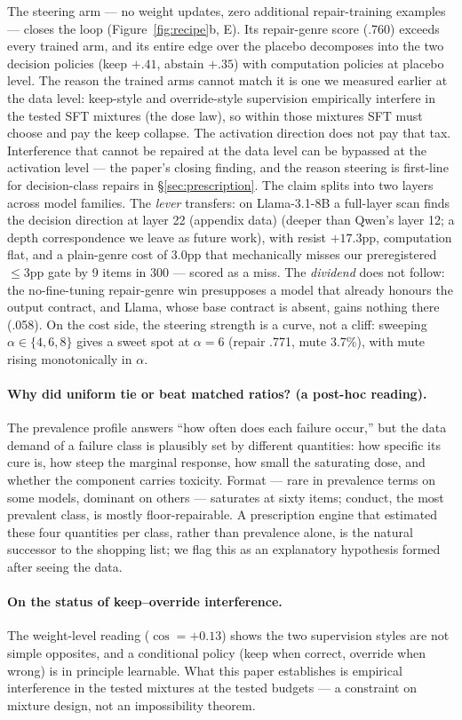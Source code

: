 The steering arm --- no weight updates, zero additional repair-training examples --- closes the loop
(Figure~\ref{fig:recipe}b, E). Its repair-genre score (.760) exceeds every
trained arm, and its entire edge over the placebo decomposes into the two
decision policies (keep $+.41$, abstain $+.35$) with computation policies at
placebo level. The reason the trained arms cannot match it is one we measured
earlier at the data level: keep-style and override-style supervision empirically interfere in the tested SFT mixtures (the dose law), so within those mixtures SFT must choose and pay the keep collapse. The activation direction does not pay that
tax. Interference that cannot be repaired at the data level can be bypassed at
the activation level --- the paper's closing finding, and the reason steering
is first-line for decision-class repairs in \S\ref{sec:prescription}. The
claim splits into two layers across model families. The \emph{lever} transfers:
on Llama-3.1-8B a full-layer scan finds the decision direction at layer 22 (appendix data)
(deeper than Qwen's layer 12; a depth correspondence we leave as future work),
with resist $+17.3$pp, computation flat, and a plain-genre cost of $3.0$pp that
mechanically misses our preregistered $\leq$3pp gate by 9 items in 300 ---
scored as a miss. The \emph{dividend} does not follow: the no-fine-tuning
repair-genre win presupposes a model that already honours the output contract,
and Llama, whose base contract is absent, gains nothing there (.058). On the
cost side, the steering strength is a curve, not a cliff: sweeping
$\alpha \in \{4,6,8\}$ gives a sweet spot at $\alpha{=}6$ (repair .771,
mute 3.7\%), with mute rising monotonically in $\alpha$.

\paragraph{Why did uniform tie or beat matched ratios? (a post-hoc reading).}
The prevalence profile answers ``how often does each failure occur,'' but the
data demand of a failure class is plausibly set by different quantities:
how specific its cure is, how steep the marginal response, how small the
saturating dose, and whether the component carries toxicity. Format --- rare
in prevalence terms on some models, dominant on others --- saturates at sixty
items; conduct, the most prevalent class, is mostly floor-repairable. A
prescription engine that estimated these four quantities per class, rather
than prevalence alone, is the natural successor to the shopping list; we flag
this as an explanatory hypothesis formed after seeing the data.

\paragraph{On the status of keep--override interference.} The weight-level
reading ($\cos = +0.13$) shows the two supervision styles are not simple
opposites, and a conditional policy (keep when correct, override when wrong)
is in principle learnable. What this paper establishes is empirical
interference in the tested mixtures at the tested budgets --- a constraint on
mixture design, not an impossibility theorem.